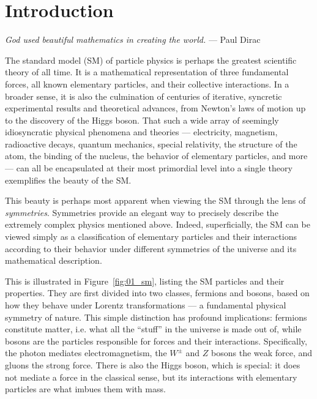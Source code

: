 
\chapter{Introduction}
\label{sec:01_intro}

\begin{center}
	\centering
	\noindent
	\textit{God used beautiful mathematics in creating the world.} --- Paul Dirac~\cite{pagels2012cosmic}
\end{center}

\baselineskip

The standard model (SM) of particle physics is perhaps the greatest scientific theory of all time.
It is a mathematical representation of three fundamental forces, all known elementary particles, and their collective interactions.
In a broader sense, it is also the culmination of centuries of iterative, syncretic experimental results and theoretical advances, from Newton's laws of motion up to the discovery of the Higgs boson.
That such a wide array of seemingly idiosyncratic physical phenomena and theories --- electricity, magnetism, radioactive decays, quantum mechanics, special relativity, the structure of the atom, the binding of the nucleus, the behavior of elementary particles, and more --- can all be encapsulated at their most primordial level into a single theory exemplifies the beauty of the SM.

This beauty is perhaps most apparent when viewing the SM through the lens of \textit{symmetries}.
Symmetries provide an elegant way to precisely describe the extremely complex physics mentioned above.
Indeed, superficially, the SM can be viewed simply as a classification of elementary particles and their interactions according to their behavior under different symmetries of the universe and its mathematical description.

This is illustrated in Figure~\ref{fig:01_sm}, listing the SM particles and their properties.
They are first divided into two classes, fermions and bosons, based on how they behave under Lorentz transformations --- a fundamental physical symmetry of nature.
This simple distinction has profound implications: fermions constitute matter, i.e. what all the ``stuff'' in the universe is made out of, while bosons are the particles responsible for forces and their interactions.
Specifically, the photon mediates electromagnetism, the $W^{\pm}$ and $Z$ bosons the weak force, and gluons the strong force.
There is also the Higgs boson, which is special: it does not mediate a force in the classical sense, but its interactions with elementary particles are what imbues them with mass.

